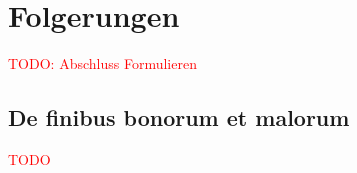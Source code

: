%
%
%
\section{Folgerungen
\label{quadratur:section:folgerungen}}
\textcolor{red}{TODO: Abschluss Formulieren}
% 

\subsection{De finibus bonorum et malorum
\label{quadratur:subsection:malorum}}
\textcolor{red}{TODO}



